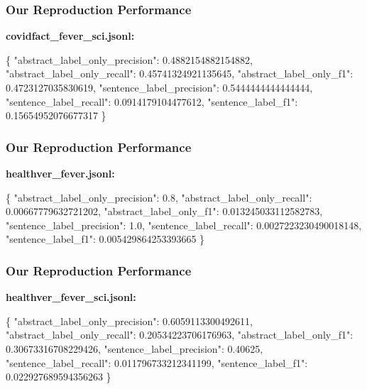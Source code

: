 \documentclass[13.5pt,aspecratio=169, xcolor=dvipsnames]{beamer}
\begin{document}
\begin{frame}[fragile]
    \onehalfspacing
        \frametitle{Our Reproduction Performance}
        \textbf{covidfact\_fever\_sci.jsonl:}
\vspace*{-1em} 
\begin{mybox}
\begin{semiverbatim}
\{
    "abstract_label_only_precision": 0.4882154882154882,
    "abstract_label_only_recall": 0.45741324921135645,
    "abstract_label_only_f1": 0.4723127035830619,
    "sentence_label_precision": 0.5444444444444444,
    "sentence_label_recall": 0.0914179104477612,
    "sentence_label_f1": 0.15654952076677317
\}\end{semiverbatim}
\end{mybox}
\end{frame}



\begin{frame}[fragile]
    \onehalfspacing
        \frametitle{Our Reproduction Performance}
        \textbf{healthver\_fever.jsonl:}
\vspace*{-1em} 
\begin{mybox}
\begin{semiverbatim}
\{
    "abstract_label_only_precision": 0.8,
    "abstract_label_only_recall": 0.00667779632721202,
    "abstract_label_only_f1": 0.013245033112582783,
    "sentence_label_precision": 1.0,
    "sentence_label_recall": 0.0027223230490018148,
    "sentence_label_f1": 0.005429864253393665
\}\end{semiverbatim}
\end{mybox}
\end{frame}

\begin{frame}[fragile]
    \onehalfspacing
        \frametitle{Our Reproduction Performance}
        \textbf{healthver\_fever\_sci.jsonl:}
\vspace*{-1em} 
\begin{mybox}
\begin{semiverbatim}
\{
    "abstract_label_only_precision": 0.6059113300492611,
    "abstract_label_only_recall": 0.20534223706176963,
    "abstract_label_only_f1": 0.30673316708229426,
    "sentence_label_precision": 0.40625,
    "sentence_label_recall": 0.011796733212341199,
    "sentence_label_f1": 0.022927689594356263
\}\end{semiverbatim}
\end{mybox}
\end{frame}
\end{document}
